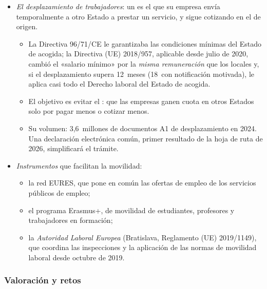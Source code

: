\documentclass[11pt]{article}
\begin{document}
\begin{itemize}
\item \emph{El desplazamiento de trabajadores}: un  es el que su empresa envía temporalmente a otro Estado a prestar un servicio, y sigue cotizando en el de origen\nocite{UE2018Desplazamiento}.
  \begin{itemize}
  \item La Directiva 96/71/CE le garantizaba las condiciones mínimas del Estado de acogida; la Directiva (UE) 2018/957, aplicable desde julio de 2020, cambió el «salario mínimo» por la \emph{misma remuneración} que los locales y, si el desplazamiento supera 12~meses (18~con notificación motivada), le aplica casi todo el Derecho laboral del Estado de acogida.
  \item El objetivo es evitar el : que las empresas ganen cuota en otros Estados solo por pagar menos o cotizar menos.
  \item Su volumen: 3,6~millones de documentos A1 de desplazamiento en 2024\nocite{CE2025A1}. Una declaración electrónica común, primer resultado de la hoja de ruta de 2026, simplificará el trámite.
  \end{itemize}
\item \emph{Instrumentos} que facilitan la movilidad:
  \begin{itemize}
  \item la red EURES, que pone en común las ofertas de empleo de los servicios públicos de empleo;
  \item el programa Erasmus+, de movilidad de estudiantes, profesores y trabajadores en formación;
  \item la \emph{Autoridad Laboral Europea} (Bratislava, Reglamento (UE) 2019/1149), que coordina las inspecciones y la aplicación de las normas de movilidad laboral desde octubre de 2019\nocite{UE2019ALE}.
  \end{itemize}
\end{itemize}

\subsubsection{Valoración y retos}\label{sec:personas-valoracion}
\end{document}
